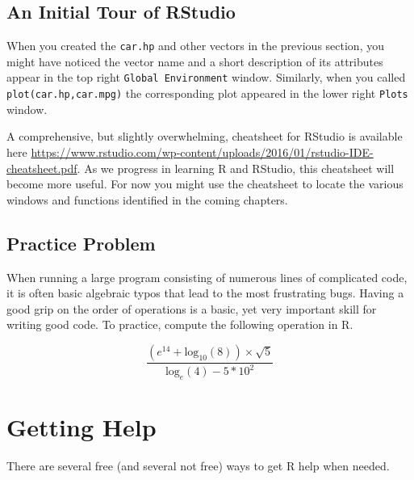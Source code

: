 \documentclass[
]{krantz}
\begin{document}
\hypertarget{an-initial-tour-of-rstudio}{%
\subsection{An Initial Tour of RStudio}\label{an-initial-tour-of-rstudio}}

When you created the \texttt{car.hp} and other vectors in the previous section, you might have noticed the vector name and a short description of its attributes appear in the top right \texttt{Global\ Environment} window. Similarly, when you called \texttt{plot(car.hp,car.mpg)} the corresponding plot appeared in the lower right \texttt{Plots} window.

A comprehensive, but slightly overwhelming, cheatsheet for RStudio is available here \url{https://www.rstudio.com/wp-content/uploads/2016/01/rstudio-IDE-cheatsheet.pdf}. As we progress in learning R and RStudio, this cheatsheet will become more useful. For now you might use the cheatsheet to locate the various windows and functions identified in the coming chapters.

\hypertarget{practice-problem}{%
\subsection{Practice Problem}\label{practice-problem}}

When running a large program consisting of numerous lines of complicated code, it is often basic algebraic typos that lead to the most frustrating bugs. Having a good grip on the order of operations is a basic, yet very important skill for writing good code. To practice, compute the following operation in R.

\[
\frac{(e^{14} + \text{log}_{10}(8)) \times \sqrt{5}}{\text{log}_{e}(4) - 5 * 10^2}
\]

\hypertarget{getting-help}{%
\section{Getting Help}\label{getting-help}}

There are several free (and several not free) ways to get R help when needed.
\end{document}
